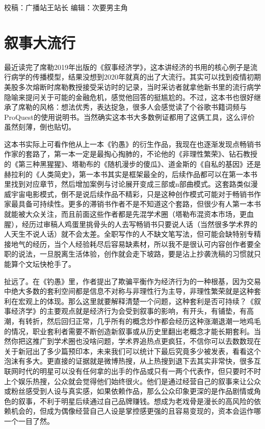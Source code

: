 \documentclass[
]{book}
\begin{document}
校稿：广播站王站长
编辑：次要男主角

\hypertarget{ux53d9ux4e8bux5927ux6d41ux884c}{%
\section{叙事大流行}\label{ux53d9ux4e8bux5927ux6d41ux884c}}

最近读完了席勒2019年出版的《叙事经济学》，这本讲经济的书用的核心例子是流行病学的传播模型，结果没想到2020年就真的出了大流行。其实可以找到疫情初期美股多次熔断时席勒教授接受采访时的记录，当时采访者就拿他新书里的流行病学隐喻来提问关于可能的金融危机，感觉他回答的挺尴尬的。不过，这本书也很好继承了席勒的风格：想法优秀，表达捉急，很多人会感觉读了个谷歌书籍词频与ProQuest的使用说明书。当然确实这本书大多数例证都用了这俩工具，这么评价虽然刻薄，倒也贴切。

这本书实际上可看作他从上一本《钓愚》的衍生作品，我现在也逐渐发现点畅销书作家的套路了，第一本一定是最掏心掏肺的，不论他的《非理性繁荣》、钻石教授的《第三种黑猩猩》、塔勒布的《随机漫步的傻瓜》、道金斯的《自私的基因》还是赫拉利的《人类简史》，第一本书其实是框架最全的，后续作品都可以在第一本书里找到对应章节，然后增加案例与讨论展开变成三部或n部曲模式。这套路类似漫威宇宙电影模式，倒不是说后续作品不精彩，只是这种创作模式可能对于畅销书作家最具备可持续性。更多的滞销书作者不是不知道这个套路，但很少有人第一本书就能被大众关注，而且前面这些作者都是先混学术圈（塔勒布混资本市场，更血腥），经历过审稿人鸡蛋里挑骨头的人去写畅销书只要说人话（当然很多学术界的人天生不说人话）就不会太差。全职写作的人不缺文笔写法，但可能会缺特别专精接地气的经历，当个人经验耗尽后容易缺素材，所以我不是很认可内容创作者要全职的说法，一旦脱离生活体验，创作就会走下坡路，要是沾上抄袭洗稿的习惯就只能算个文坛快枪手了。

扯远了。在《钓愚》里，作者提出了欺骗平衡作为经济行为的一种根基，因为交易中绝大多数的套利空间都是信息不对称与非理性行为主导，非理性繁荣就是这种套利在宏观上的体现。那么这里就要解释清楚一个问题，这种套利是否可持续？《叙事经济学》的主要观点就是经济行为会受到叙事的影响，有开头，有铺垫，有高潮，有转折，然后回归正常，几乎所有的概念炒作都会经历这种涨潮退潮一地鸡毛的情况，职业套利者需要不断创造新叙事或从历史里翻出老概念才能长期套利。当然你把这推广到学术圈也没啥问题，学术界追热点更疯狂，不信你可以去数数现在关于新冠出了多少篇预印本，未来我们可以统计下最后究竟多少被发表，看看这个泡沫有多大。更直接的证据就是微博热搜，从上热搜到退下去其实非常快，很多互联网时代的明星可以没有任何拿的出手的作品或只有一两个代表作，但只要时不时上个娱乐热搜，公众就会觉得他们始终很火。他们是通过经营自己的叙事来让公众或粉丝感受到人设与真实感，如果依赖作品，那么公众印象更深的是作品剧情或角色的叙事，不利于明星后续通过自己品牌赚钱。想成为老戏骨是漫长的高风险的依赖机会的，但成为偶像经营自己人设是掌控感更强的且容易变现的，资本会运作哪一个一目了然。
\end{document}
